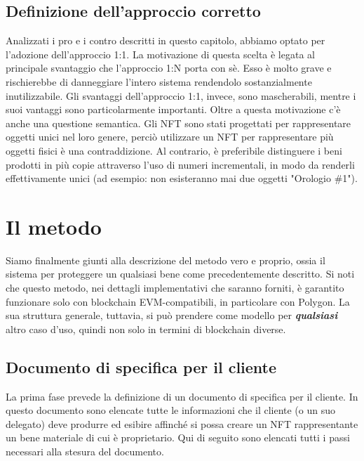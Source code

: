 \documentclass[12pt]{report}
\begin{document}
\section{Definizione dell'approccio corretto}
Analizzati i pro e i contro descritti in questo capitolo, abbiamo optato per l'adozione dell'approccio 1:1.\newline
La motivazione di questa scelta è legata al principale svantaggio che l'approccio 1:N porta con sè. Esso è molto grave e rischierebbe di danneggiare l'intero sistema rendendolo sostanzialmente inutilizzabile. Gli svantaggi dell'approccio 1:1, invece, sono mascherabili, mentre i suoi vantaggi sono particolarmente importanti.\newline
Oltre a questa motivazione c'è anche una questione semantica. Gli NFT sono stati progettati per rappresentare oggetti unici nel loro genere, perciò utilizzare un NFT per rappresentare più oggetti fisici è una contraddizione. Al contrario, è preferibile distinguere i beni prodotti in più copie attraverso l'uso di numeri incrementali, in modo da renderli effettivamente unici (ad esempio: non esisteranno mai due oggetti "Orologio \#1").

\chapter{Il metodo}
\label{chap:metodo}
\noindent
Siamo finalmente giunti alla descrizione del metodo vero e proprio, ossia il sistema per proteggere un qualsiasi bene come precedentemente descritto.\newline
Si noti che questo metodo, nei dettagli implementativi che saranno forniti, è garantito funzionare solo con blockchain EVM-compatibili, in particolare con Polygon.\newline
La sua struttura generale, tuttavia, si può prendere come modello per \textit{\textbf{qualsiasi}} altro caso d'uso, quindi non solo in termini di blockchain diverse.
\section{Documento di specifica per il cliente}
\label{sec:documento}
\noindent
La prima fase prevede la definizione di un documento di specifica per il cliente.\newline
In questo documento sono elencate tutte le informazioni che il cliente (o un suo delegato) deve produrre ed esibire affinché si possa creare un NFT rappresentante un bene materiale di cui è proprietario.\newline
Qui di seguito sono elencati tutti i passi necessari alla stesura del documento.
\end{document}
